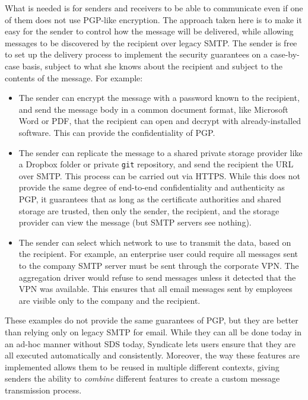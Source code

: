 What is needed is for senders and receivers to be able to communicate even if
one of them does not use PGP-like encryption.  The approach taken here is to
make it easy for the sender to control how the message will be delivered, while
allowing messages to be discovered by the recipient over legacy SMTP.  The
sender is free to set up the delivery process to implement the security
guarantees on a case-by-case basis, subject to what she knows about the recipient and subject to
the contents of the message.  For example:

\begin{itemize}
\item The sender can encrypt the message with a password known to the recipient,
and send the message body in a common document format, like Microsoft Word or
PDF, that the recipient can open and decrypt with already-installed software.
This can provide the confidentiality of PGP.
\item The sender can replicate the message to a shared private storage provider
like a Dropbox folder or private \texttt{git} repository, and send the
recipient the URL over SMTP.  This process can be carried out via HTTPS.
While this does not provide the same
degree of end-to-end confidentiality and authenticity as PGP, it guarantees that as long as
the certificate authorities and shared storage are trusted, then only the sender, the recipient, and the
storage provider can view the message (but SMTP servers see nothing).
\item The sender can select which network to use to transmit the data, based on
the recipient.  For example, an enterprise user could require all messages sent
to the company SMTP server must be sent through the corporate
VPN.  The aggregation driver would refuse to send messages unless it detected
that the VPN was available.  This ensures that all email messages sent by employees are
visible only to the company and the recipient.
\end{itemize}

These examples do not provide the same guarantees of PGP, but they are
better than relying only on legacy SMTP for email.  While they can all be done
today in an ad-hoc manner without SDS today,
Syndicate lets users ensure that they are all executed
automatically and consistently.  Moreover, the way these features are
implemented allows them to be reused in multiple different contexts, giving senders the
ability to \emph{combine} different features to create a custom message
transmission process.

